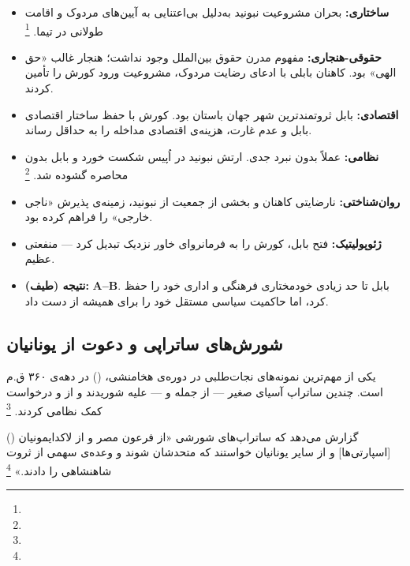 \begin{tcolorbox}[casebox, title={تحلیل شش‌وجهی: ورود کورش به بابل (۵۳۹ ق.م)}]
\begin{itemize}[nosep, rightmargin=1em]
  \item \textbf{ساختاری:} بحران مشروعیت نبونید به‌دلیل بی‌اعتنایی به آیین‌های مردوک و اقامت طولانی در تیما.%
  \footnote{}
  \item \textbf{حقوقی-هنجاری:} مفهوم مدرن حقوق بین‌الملل وجود نداشت؛ هنجار غالب «حق الهی» بود. کاهنان بابلی با ادعای رضایت مردوک، مشروعیت ورود کورش را تأمین کردند.
  \item \textbf{اقتصادی:} بابل ثروتمندترین شهر جهان باستان بود. کورش با حفظ ساختار اقتصادی بابل و عدم غارت، هزینه‌ی اقتصادی مداخله را به حداقل رساند.
  \item \textbf{نظامی:} عملاً بدون نبرد جدی. ارتش نبونید در اُپیس شکست خورد و بابل بدون محاصره گشوده شد.%
  \footnote{}
  \item \textbf{روان‌شناختی:} نارضایتی کاهنان و بخشی از جمعیت از نبونید، زمینه‌ی پذیرش «ناجی خارجی» را فراهم کرده بود.
  \item \textbf{ژئوپولیتیک:} فتح بابل، کورش را به فرمانروای خاور نزدیک تبدیل کرد — منفعتی عظیم.
  \item \textbf{نتیجه (طیف):} \textbf{A–B}. بابل تا حد زیادی خودمختاری فرهنگی و اداری خود را حفظ کرد، اما حاکمیت سیاسی مستقل خود را برای همیشه از دست داد.
\end{itemize}
\end{tcolorbox}

\subsection{شورش‌های ساتراپی و دعوت از یونانیان}
\label{subsec:ch04-satrapal-revolts}

یکی از مهم‌ترین نمونه‌های نجات‌طلبی در دوره‌ی هخامنشی،  () در دهه‌ی ۳۶۰ ق.م است. چندین ساتراپ آسیای صغیر — از جمله  و  — علیه  شوریدند و از  و  درخواست کمک نظامی کردند.%
\footnote{}

 () گزارش می‌دهد که ساتراپ‌های شورشی «از فرعون مصر و از لاکدایمونیان [اسپارتی‌ها] و از سایر یونانیان خواستند که متحدشان شوند و وعده‌ی سهمی از ثروت شاهنشاهی را دادند.»%
\footnote{}

